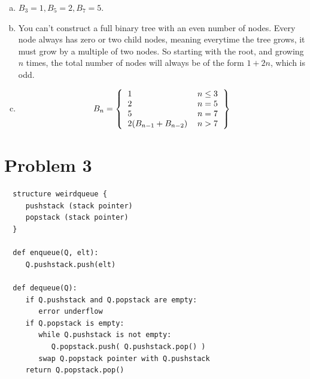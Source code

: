 \documentclass[a4paper,12pt]{article}
\begin{document}
\begin{enumerate}[a)]

\item $B_3 = 1, B_5 = 2, B_7 = 5$.

\item You can't construct a full binary tree with an even number of
  nodes. Every node always has zero or two child nodes, meaning
  everytime the tree grows, it must grow by a multiple of two
  nodes. So starting with the root, and growing $n$ times, the total
  number of nodes will always be of the form $1 + 2n$, which is odd.

\item

  \[B_n = \left\{
    \begin{tabular}{l r}
      1 & $n \le 3$\\
      2 & $n=5$\\
      5 & $n=7$\\
      $2(B_{n-1} + B_{n-2})$ &  $n > 7$\\
    \end{tabular}
  \right\}\]

\end{enumerate}


\section*{Problem 3}


\begin{verbatim}
  structure weirdqueue {
     pushstack (stack pointer)
     popstack (stack pointer)
  }

  def enqueue(Q, elt):
     Q.pushstack.push(elt)

  def dequeue(Q):
     if Q.pushstack and Q.popstack are empty:
        error underflow
     if Q.popstack is empty:
        while Q.pushstack is not empty:
           Q.popstack.push( Q.pushstack.pop() )
        swap Q.popstack pointer with Q.pushstack
     return Q.popstack.pop()

\end{verbatim}
\end{document}
